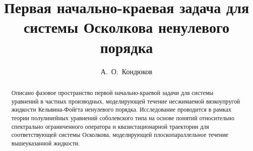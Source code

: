 

\usepackage[russian]{nla}

%
%


%




%
\fi

\title{Первая начально-краевая задача для системы Осколкова ненулевого порядка}
\author{А.~О.~Кондюков}  %
  



\maketitle

\begin{abstract}
Описано фазовое пространство первой начально-краевой задачи для системы уравнений в частных производных, моделирующей  течение несжимаемой вязкоупругой жидкости Кельвина-Фойгта ненулевого порядка. Исследование проводится в рамках теории полулинейных уравнений соболевского типа на основе понятий относительно спектрально ограниченного оператора  и квазистационарной траектории для соответствующей системы Осколкова, моделирующей плоскопараллельное течение вышеуказанной жидкости.

\end{abstract}


